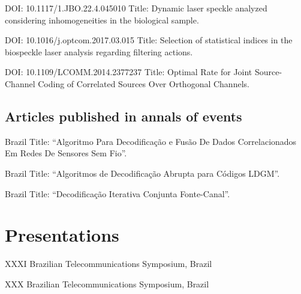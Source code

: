 \documentclass[11pt,a4paper,sans]{moderncv} %
\begin{document}
	      {DOI: 10.1117/1.JBO.22.4.045010}{}{}
	      {Title: Dynamic laser speckle analyzed considering inhomogeneities in the biological sample.}
	      
	      {DOI: 10.1016/j.optcom.2017.03.015}{}{}
	      {Title: Selection of statistical indices in the biospeckle laser analysis regarding filtering actions.}
	      
	      {DOI: 10.1109/LCOMM.2014.2377237}{}{}
	      {Title: Optimal  Rate for Joint Source-Channel Coding of Correlated Sources Over Orthogonal Channels.}

\subsection{Articles published in annals of events}

	      {Brazil}{}{}
	      {Title: ``Algoritmo Para Decodificação e Fusão De Dados Correlacionados Em Redes De Sensores Sem Fio''.}

	      {Brazil}{}{}
	      {Title: ``Algoritmos de Decodificação Abrupta para Códigos LDGM''.}

	      {Brazil}{}{}
	      {Title: ``Decodificação Iterativa Conjunta Fonte-Canal''.}




\section{Presentations}

	      {}{}{}
	      {XXXI Brazilian Telecommunications Symposium, Brazil}

	      {}{}{}
	      {XXX Brazilian Telecommunications Symposium, Brazil}
\end{document}
